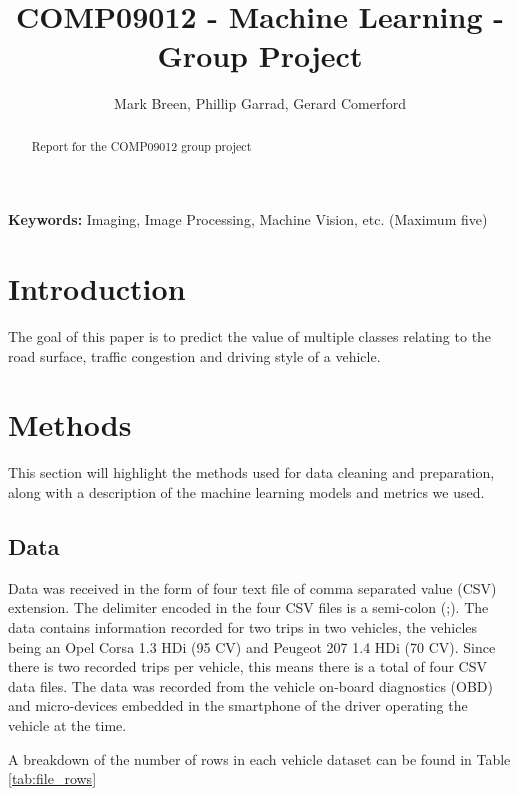 \documentclass[a4paper,11pt]{article}
\begin{document}
\title{COMP09012 - Machine Learning - Group Project}

\author{Mark Breen, Phillip Garrad, Gerard Comerford}
\date{}
\maketitle
\thispagestyle{empty}



\begin{abstract}
Report for the COMP09012 group project
\end{abstract}
\textbf{Keywords:} Imaging, Image Processing, Machine Vision, etc. (Maximum five)



\section{Introduction}

The goal of this paper is to predict the value of multiple classes relating to the road surface, traffic congestion and driving style of a vehicle.


\section{Methods}

This section will highlight the methods used for data cleaning and preparation, along with a description of the machine learning models and metrics we used.

\subsection{Data}

Data was received in the form of four text file of comma separated value (CSV) extension. The delimiter encoded in the four CSV files is a semi-colon (;). The data contains information recorded for two trips in two vehicles, the vehicles being an Opel Corsa 1.3 HDi (95 CV) and Peugeot 207 1.4 HDi (70 CV). Since there is two recorded trips per vehicle, this means there is a total of four CSV data files. The data was recorded from the vehicle on-board diagnostics (OBD) and micro-devices embedded in the smartphone of the driver operating the vehicle at the time.

A breakdown of the number of rows in each vehicle dataset can be found in Table \ref{tab:file_rows}
\end{document}
